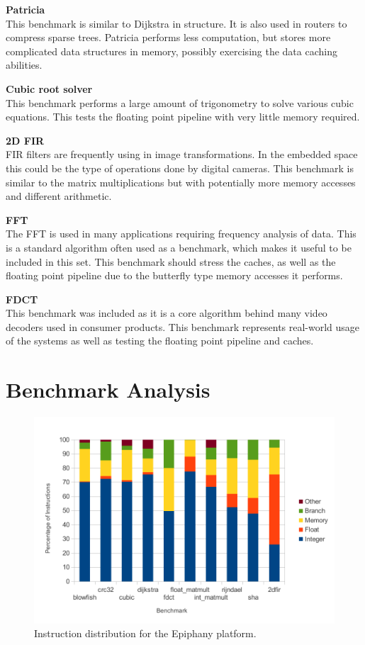 \documentclass[twocolumn]{article}
\begin{document}
\vspace{3mm}
\textbf{Patricia}\\
This benchmark is similar to Dijkstra in structure. It is also used in routers to compress sparse trees. Patricia performs less computation, but stores more complicated data structures in memory, possibly exercising the data caching abilities.

\vspace{3mm}
\textbf{Cubic root solver}\\
This benchmark performs a large amount of trigonometry to solve various cubic equations. This tests the floating point pipeline with very little memory required.

\vspace{3mm}
\textbf{2D FIR}\\
FIR filters are frequently using in image transformations. In the embedded space this could be the type of operations done by digital cameras. This benchmark is similar to the matrix multiplications but with potentially more memory accesses and different arithmetic.

\vspace{3mm}
\textbf{FFT}\\
The FFT is used in many applications requiring frequency analysis of data. This is a standard algorithm often used as a benchmark, which makes it useful to be included in this set. This benchmark should stress the caches, as well as the floating point pipeline due to the butterfly type memory accesses it performs.

\vspace{3mm}
\textbf{FDCT}\\
This benchmark was included as it is a core algorithm behind many video decoders used in consumer products. This benchmark represents real-world usage of the systems as well as testing the floating point pipeline and caches.

\section{Benchmark Analysis}

\begin{figure}[t]
	\includegraphics[width=\linewidth]{epiphany.pdf}
	\caption{Instruction distribution for the Epiphany platform.}
	\label{Fig:InstructionDistributionEpiphany}
\end{figure}
\end{document}
